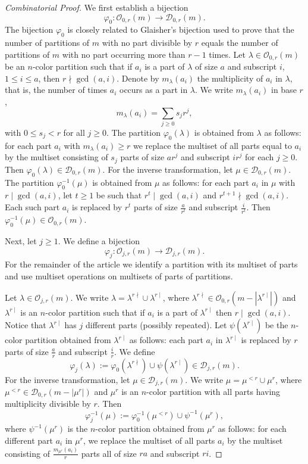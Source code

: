 \documentclass[reqno,12pt]{amsart}
\theoremstyle{definition}
\newcommand{\ds}{\displaystyle}
\begin{document}
\begin{proof}[Combinatorial Proof]

We first establish a bijection $$\varphi_0:\mathcal O_{0,r}(m)\to \mathcal D_{0,r}(m).$$ The bijection $\varphi_0$ is closely related to Glaisher's bijection used to prove that the number of partitions of $m$ with no part divisible by $r$ equals the number of partitions of $m$ with no part occurring more than $r-1$ times. Let $\lambda\in \mathcal O_{0,r}(m)$ be an $n$-color partition such that if $a_i$ is a part of $\lambda$ of size $a$ and subscript $i$, $1\leq i\leq a$, then $r\nmid \gcd(a,i)$. Denote by $m_\lambda(a_i)$ the multiplicity of $a_i$ in $\lambda$, that is, the number of times $a_i$ occurs as a part in $\lambda$. We write $m_\lambda(a_i)$ in base $r$, $$m_\lambda(a_i)=\sum_{j\geq 0}s_jr^j,$$ with $0\leq s_j<r$ for all $j\geq 0$. The partition $\varphi_0(\lambda)$ is obtained from $\lambda$ as follows:  for each part $a_i$ with $m_\lambda(a_i)\geq r$ we replace the multiset of all parts equal to $a_i$ by the multiset consisting of $s_j$ parts of size $ar^j$ and subscript $ir^j$ for each  $j\geq 0$. Then $\varphi_0(\lambda)\in  \mathcal D_{0,r}(m)$. For the inverse transformation, let $\mu\in  \mathcal D_{0,r}(m)$. The partition $\varphi_0^{-1}(\mu)$ is obtained from $\mu$ as follows: for each part $a_i$ in $\mu$ with $r\mid \gcd(a,i)$, let $t\geq 1$ be such that $r^t\mid \gcd(a,i)$ and $r^{t+1}\nmid \gcd(a,i)$. Each such part $a_i$ is replaced by $r^t$ parts of size $\displaystyle\frac{a}{r^t}$ and subscript $\displaystyle\frac{i}{r^t}$. Then $\varphi_0^{-1}(\mu)\in \mathcal O_{0,r}(m)$.\smallskip

Next, let $j\geq 1$. We define a bijection $$\varphi_j:\mathcal O_{j,r}(m)\to \mathcal D_{j,r}(m).$$  For the remainder of the article we identify a partition with its multiset of parts and use multiset operations on  multisets of parts of partitions. 

Let $\lambda\in \mathcal O_{j,r}(m)$. We write $\lambda=\lambda^{r\nmid}\cup \lambda^{r\mid}$,   where $\lambda^{r\nmid}\in \mathcal O_{0,r}(m-|\lambda^{r\mid}|)$ and $\lambda^{r\mid}$ is an $n$-color partition such that if $a_i$ is a part of $\lambda^{r\mid}$ then $r\mid \gcd(a,i)$. Notice that $\lambda^{r\mid}$ has $j$ different parts (possibly repeated). Let $\psi(\lambda^{r\mid})$ be the $n$-color partition obtained from $\lambda^{r\mid}$ as follows: each part $a_i$ in $\lambda^{r\mid}$ is replaced by $r$ parts of size $\displaystyle \frac{a}{r}$ and subscript $\displaystyle \frac{i}{r}$.
 We define 
 $$\varphi_j(\lambda):=\varphi_0(\lambda^{r\nmid}) \cup \psi( \lambda^{r\mid}) \in \mathcal D_{j,r}(m).$$ 
 For the inverse transformation, let $\mu\in \mathcal D_{j,r}(m)$. We write $\mu=\mu^{<r} \cup \mu^r$, where $\mu^{<r}\in \mathcal D_{0,r}(m-|\mu^r|)$ and $\mu^r$ is an $n$-color partition with all parts having multiplicity divisible by $r$. Then 
 $$\varphi_j^{-1}(\mu):=\varphi_0^{-1}(\mu^{<r})\cup \psi^{-1}(\mu^r),$$
 where $\psi^{-1}(\mu^r)$ is the $n$-color partition obtained from $\mu^r$ as follows: for each different part $a_i$ in $\mu^r$, we replace the multiset of all parts $a_i$ by the multiset consisting of $\ds\frac{m_{\mu^r}(a_i)}{r}$ parts all of size $ra$ and subscript $ri$.
\end{proof}
\end{document}
